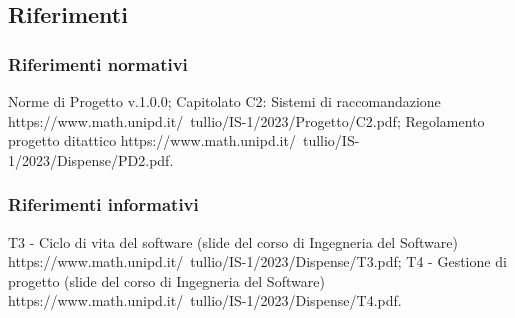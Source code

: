 \subsection{Riferimenti}
\subsubsection{Riferimenti normativi}
Norme di Progetto v.1.0.0;
Capitolato C2: Sistemi di raccomandazione
https://www.math.unipd.it/~tullio/IS-1/2023/Progetto/C2.pdf;
Regolamento progetto ditattico
https://www.math.unipd.it/~tullio/IS-1/2023/Dispense/PD2.pdf.

\subsubsection{Riferimenti informativi}
T3 - Ciclo di vita del software (slide del corso di Ingegneria del Software)
https://www.math.unipd.it/~tullio/IS-1/2023/Dispense/T3.pdf;
T4 - Gestione di progetto (slide del corso di Ingegneria del Software)
https://www.math.unipd.it/~tullio/IS-1/2023/Dispense/T4.pdf.
